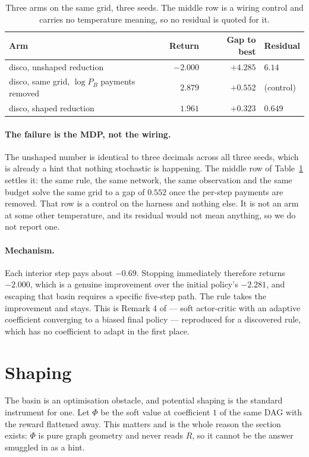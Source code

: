 \documentclass[11pt]{article}
\theoremstyle{remark}
\begin{document}
\begin{table}[t]
\centering
\begin{tabular}{lrrl}
\toprule
Arm & Return & Gap to best & Residual \\
\midrule
disco, unshaped reduction & $-2.000$ & $+4.285$ & $6.14$ \\
disco, same grid, $\log P_B$ payments removed & $2.879$ & $+0.552$ & (control) \\
disco, shaped reduction & $1.961$ & $+0.323$ & $0.649$ \\
\bottomrule
\end{tabular}
\caption{Three arms on the same grid, three seeds. The middle row is a wiring
control and carries no temperature meaning, so no residual is quoted for it.}
\label{tab:mdp}
\end{table}

\paragraph{The failure is the MDP, not the wiring.} The unshaped number is
identical to three decimals across all three seeds, which is already a hint that
nothing stochastic is happening. The middle row of Table~\ref{tab:mdp} settles it:
the same rule, the same network, the same observation and the same budget solve
the same grid to a gap of $0.552$ once the per-step payments are removed. That
row is a control on the harness and nothing else. It is not an arm at some other
temperature, and its residual would not mean anything, so we do not report one.

\paragraph{Mechanism.} Each interior step pays about $-0.69$. Stopping
immediately therefore returns $-2.000$, which is a genuine improvement over the
initial policy's $-2.281$, and escaping that basin requires a specific five-step
path. The rule takes the improvement and stays. This is Remark 4 of
\cite{tiapkin2024} --- soft actor-critic with an adaptive coefficient converging
to a biased final policy --- reproduced for a discovered rule, which has no
coefficient to adapt in the first place.

\section{Shaping}\label{sec:shaping}

The basin is an optimisation obstacle, and potential shaping is the standard
instrument for one. Let $\Phi$ be the soft value at coefficient $1$ of the same
DAG with the reward flattened away. This matters and is the whole reason the
section exists: $\Phi$ is pure graph geometry and never reads $R$, so it cannot
be the answer smuggled in as a hint.
\end{document}
